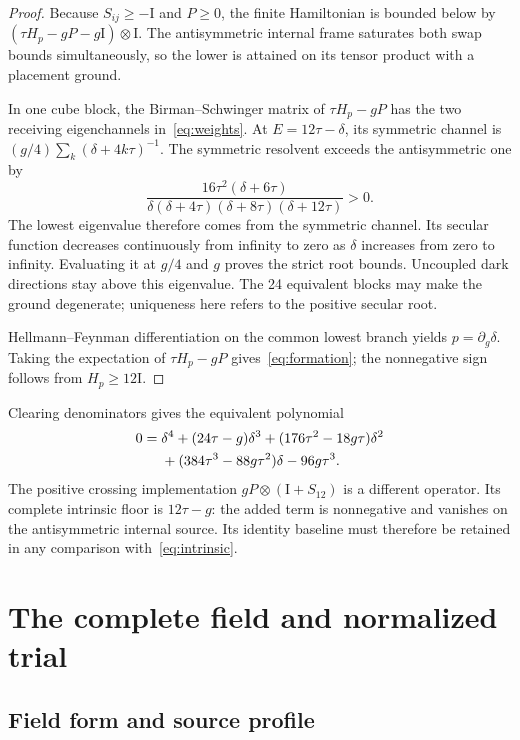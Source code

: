 \documentclass[11pt]{article}
\theoremstyle{definition}
\newcommand{\Id}{\mathrm I}
\begin{document}
\begin{proof}
Because $S_{ij}\geq-\Id$ and $P\geq0$, the finite Hamiltonian is bounded below by $(\tau H_p-gP-g\Id)\otimes\Id$. The antisymmetric internal frame saturates both swap bounds simultaneously, so the lower is attained on its tensor product with a placement ground.

In one cube block, the Birman--Schwinger matrix of $\tau H_p-gP$ has the two receiving eigenchannels in~\eqref{eq:weights}. At $E=12\tau-\delta$, its symmetric channel is $(g/4)\sum_k(\delta+4k\tau)^{-1}$. The symmetric resolvent exceeds the antisymmetric one by
\begin{equation}\label{eq:resdifference}
 \frac{16\tau^2(\delta+6\tau)}
 {\delta(\delta+4\tau)(\delta+8\tau)(\delta+12\tau)}>0.
\end{equation}
The lowest eigenvalue therefore comes from the symmetric channel. Its secular function decreases continuously from infinity to zero as $\delta$ increases from zero to infinity. Evaluating it at $g/4$ and $g$ proves the strict root bounds. Uncoupled dark directions stay above this eigenvalue. The 24 equivalent blocks may make the ground degenerate; uniqueness here refers to the positive secular root.

Hellmann--Feynman differentiation on the common lowest branch yields $p=\partial_g\delta$. Taking the expectation of $\tau H_p-gP$ gives~\eqref{eq:formation}; the nonnegative sign follows from $H_p\geq12\Id$.
\end{proof}

Clearing denominators gives the equivalent polynomial
\begin{align}\label{eq:quartic}
0={}&\delta^4+(24\tau-g)\delta^3+(176\tau^2-18g\tau)\delta^2\notag\\
 &+(384\tau^3-88g\tau^2)\delta-96g\tau^3.
\end{align}
The positive crossing implementation $gP\otimes(\Id+S_{12})$ is a different operator. Its complete intrinsic floor is $12\tau-g$: the added term is nonnegative and vanishes on the antisymmetric internal source. Its identity baseline must therefore be retained in any comparison with~\eqref{eq:intrinsic}.

\section{The complete field and normalized trial}\label{sec:field}

\subsection{Field form and source profile}
\end{document}
